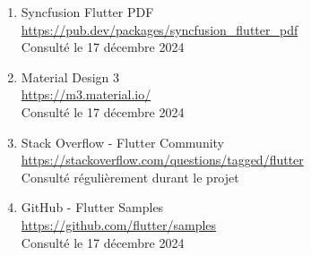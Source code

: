 \documentclass[12pt,a4paper]{report}
\begin{document}
\begin{enumerate}
    \item Syncfusion Flutter PDF \\
    \url{https://pub.dev/packages/syncfusion_flutter_pdf} \\
    Consulté le 17 décembre 2024
    
    \item Material Design 3 \\
    \url{https://m3.material.io/} \\
    Consulté le 17 décembre 2024
    
    \item Stack Overflow - Flutter Community \\
    \url{https://stackoverflow.com/questions/tagged/flutter} \\
    Consulté régulièrement durant le projet
    
    \item GitHub - Flutter Samples \\
    \url{https://github.com/flutter/samples} \\
    Consulté le 17 décembre 2024
\end{enumerate}
\end{document}
